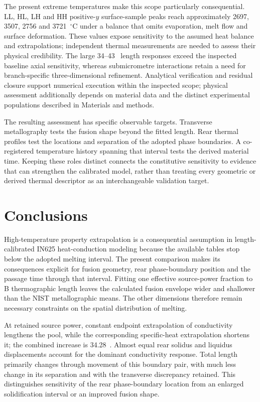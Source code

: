 The present extreme temperatures make this scope particularly consequential. LL, HL, LH and HH positive-$y$ surface-sample peaks reach approximately 2697, 3507, 2756 and 3721~$^\circ$C under a balance that omits evaporation, melt flow and surface deformation. These values expose sensitivity to the assumed heat balance and extrapolations; independent thermal measurements are needed to assess their physical credibility. The large 34--43~\um{} length responses exceed the inspected baseline axial sensitivity, whereas submicrometre interactions retain a need for branch-specific three-dimensional refinement. Analytical verification and residual closure support numerical execution within the inspected scope; physical assessment additionally depends on material data and the distinct experimental populations described in Materials and methods.

The resulting assessment has specific observable targets. Transverse metallography tests the fusion shape beyond the fitted length. Rear thermal profiles test the locations and separation of the adopted phase boundaries. A co-registered temperature history spanning that interval tests the derived material time. Keeping these roles distinct connects the constitutive sensitivity to evidence that can strengthen the calibrated model, rather than treating every geometric or derived thermal descriptor as an interchangeable validation target.

\section{Conclusions}
High-temperature property extrapolation is a consequential assumption in length-calibrated IN625 heat-conduction modeling because the available tables stop below the adopted melting interval. The present comparison makes its consequences explicit for fusion geometry, rear phase-boundary position and the passage time through that interval. Fitting one effective source-power fraction to B thermographic length leaves the calculated fusion envelope wider and shallower than the NIST metallographic means. The other dimensions therefore remain necessary constraints on the spatial distribution of melting.

At retained source power, constant endpoint extrapolation of conductivity lengthens the pool, while the corresponding specific-heat extrapolation shortens it; the combined increase is 34.28~\um{}. Almost equal rear solidus and liquidus displacements account for the dominant conductivity response. Total length primarily changes through movement of this boundary pair, with much less change in its separation and with the transverse discrepancy retained. This distinguishes sensitivity of the rear phase-boundary location from an enlarged solidification interval or an improved fusion shape.


